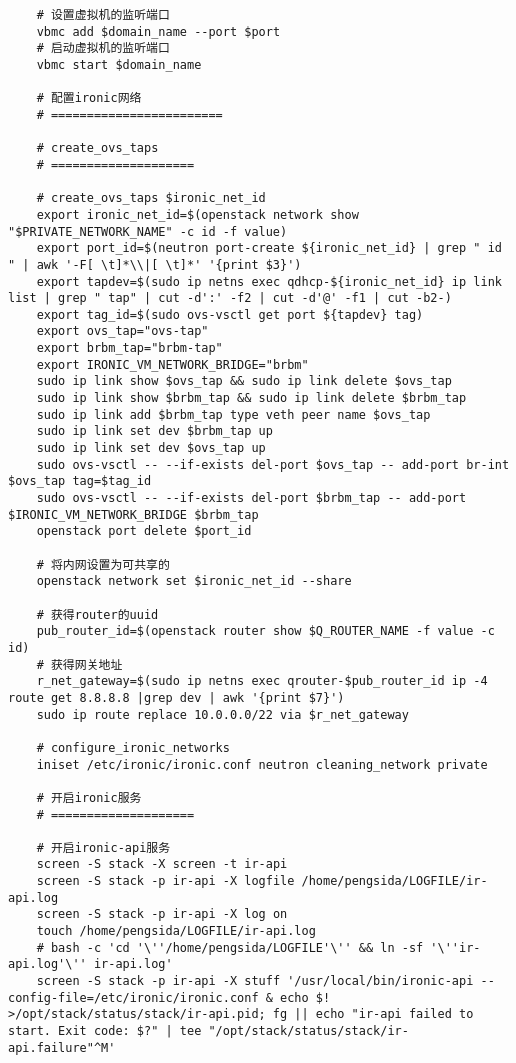 \documentclass[a4paper,left=1.5cm,right=1.5cm,11pt]{article}
\begin{document}
\begin{lstlisting}
	# 设置虚拟机的监听端口
	vbmc add $domain_name --port $port
	# 启动虚拟机的监听端口
	vbmc start $domain_name

	# 配置ironic网络
	# ========================

	# create_ovs_taps
	# ====================

	# create_ovs_taps $ironic_net_id
	export ironic_net_id=$(openstack network show "$PRIVATE_NETWORK_NAME" -c id -f value)
	export port_id=$(neutron port-create ${ironic_net_id} | grep " id " | awk '-F[ \t]*\\|[ \t]*' '{print $3}')
	export tapdev=$(sudo ip netns exec qdhcp-${ironic_net_id} ip link list | grep " tap" | cut -d':' -f2 | cut -d'@' -f1 | cut -b2-)
	export tag_id=$(sudo ovs-vsctl get port ${tapdev} tag)
	export ovs_tap="ovs-tap"
    export brbm_tap="brbm-tap"
	export IRONIC_VM_NETWORK_BRIDGE="brbm"
    sudo ip link show $ovs_tap && sudo ip link delete $ovs_tap
    sudo ip link show $brbm_tap && sudo ip link delete $brbm_tap
    sudo ip link add $brbm_tap type veth peer name $ovs_tap
    sudo ip link set dev $brbm_tap up
    sudo ip link set dev $ovs_tap up
    sudo ovs-vsctl -- --if-exists del-port $ovs_tap -- add-port br-int $ovs_tap tag=$tag_id
    sudo ovs-vsctl -- --if-exists del-port $brbm_tap -- add-port $IRONIC_VM_NETWORK_BRIDGE $brbm_tap
	openstack port delete $port_id

	# 将内网设置为可共享的
	openstack network set $ironic_net_id --share

	# 获得router的uuid
	pub_router_id=$(openstack router show $Q_ROUTER_NAME -f value -c id)
	# 获得网关地址
	r_net_gateway=$(sudo ip netns exec qrouter-$pub_router_id ip -4 route get 8.8.8.8 |grep dev | awk '{print $7}')
	sudo ip route replace 10.0.0.0/22 via $r_net_gateway

	# configure_ironic_networks
	iniset /etc/ironic/ironic.conf neutron cleaning_network private

	# 开启ironic服务
	# ====================

	# 开启ironic-api服务
	screen -S stack -X screen -t ir-api
	screen -S stack -p ir-api -X logfile /home/pengsida/LOGFILE/ir-api.log
    screen -S stack -p ir-api -X log on
	touch /home/pengsida/LOGFILE/ir-api.log
    # bash -c 'cd '\''/home/pengsida/LOGFILE'\'' && ln -sf '\''ir-api.log'\'' ir-api.log'
	screen -S stack -p ir-api -X stuff '/usr/local/bin/ironic-api --config-file=/etc/ironic/ironic.conf & echo $! >/opt/stack/status/stack/ir-api.pid; fg || echo "ir-api failed to start. Exit code: $?" | tee "/opt/stack/status/stack/ir-api.failure"^M'


\end{lstlisting}
\end{document}
